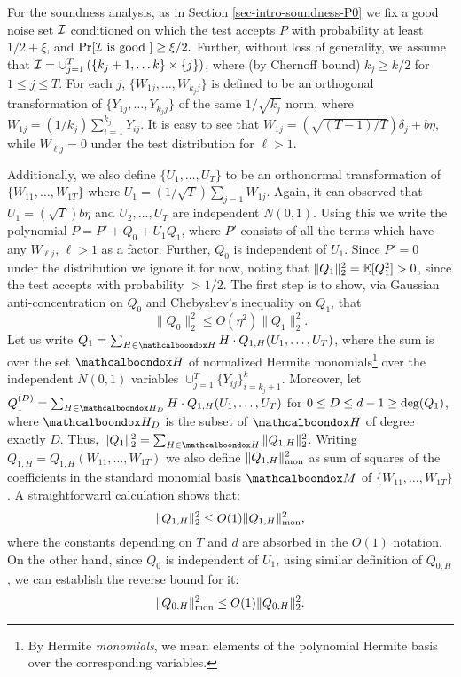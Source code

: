 For the soundness analysis, as in Section
\ref{sec-intro-soundness-P0} we fix a good noise set $\mathcal{I}$ 
conditioned on which the test accepts $P$ with probability at least
$1/2 + \xi$, and $\Pr[\mathcal{I} \textnormal{ is good }] \geq \xi/2.$ 
Further, without loss of generality, we assume that $\mathcal{I} = \cup_{j=1}^T \left(\{k_j + 1,\dots
k\}\times\{j\}\right)$, where (by Chernoff bound) $k_j \geq k/2$ for
$1\leq j \leq T$. For each $j$, $\{W_{1j},\dots, W_{k_jj}\}$ is
defined to be an orthogonal transformation of $\{Y_{1j},\dots,
Y_{k_jj}\}$ of the same $1/\sqrt{k_j}$ norm, where $W_{1j} =
(1/k_j)\sum_{i=1}^{k_j}Y_{ij}$. It is easy to see that $W_{1j} =  
(\sqrt{(T-1)/T})\delta_{j} + b\eta$, while $W_{\ell j} = 0$ under the
test distribution for $\ell > 1$.

Additionally, we also define $\{U_1,\dots, U_T\}$ to be an orthonormal
transformation of $\{W_{11},\dots, W_{1T}\}$ where $U_1 =
(1/\sqrt{T})\sum_{j=1}W_{1j}$. Again, it can observed that $U_1 =
(\sqrt{T})b\eta$ and $U_2,\dots, U_T$ are independent $N(0,1)$. Using
this we write  the polynomial $P = P' + Q_0 + U_1 Q_1$, where $P'$
consists of all the terms which have any $W_{\ell j}$, $\ell > 1$ as a
factor. Further, $Q_0$ is independent of $U_1$. Since $P' = 0$ under
the distribution we ignore it for now, noting that $\|Q_1\|_2^2 =
\mathbb{E}[Q_1^2] > 0$, since the test accepts with probability $ > 1/2$. 
The first step is to show, via Gaussian
anti-concentration on $Q_0$ and Chebyshev's inequality on $Q_1$, that
\begin{equation}\label{eqn:relative}
\|Q_0\|_2^2 \leq O(\eta^2)\|Q_1\|_2^2.
\end{equation}
Let us write $Q_1 = \sum_{H\in \mcb{H}} H\cdot Q_{1,H}(U_1,\dots, U_T)$, where the
sum is over the set $\mcb{H}$ of normalized Hermite monomials\footnote{By Hermite \emph{monomials},
we mean elements of the polynomial Hermite basis over the corresponding variables.} 
over the independent $N(0,1)$
variables $\cup_{j=1}^T\{Y_{ij}\}_{i=k_j+
1}^k$. Moreover, let  $Q^{(D)}_1 = \sum_{H \in \mcb{H}_D} 
H\cdot Q_{1,H}(U_1,\dots, U_T)$ for $0\leq D \leq
d-1 \geq \textnormal{deg}(Q_1)$, where $\mcb{H}_D$ is the subset of $\mcb{H}$
of degree exactly $D$.
Thus,  $\|Q_1\|_2^2 = \sum_{H\in \mcb{H}} \|Q_{1,H}\|_2^2$. Writing
$Q_{1,H} = Q_{1,H}(W_{11}, \dots, W_{1T})$ we also
define $\|Q_{1,H}\|_{\textnormal{mon}}^2$ as sum of squares of the
coefficients in 
the standard monomial basis $\mcb{M}$ of $\{W_{11}, \dots, W_{1T}\}$. A
straightforward calculation shows that:
\begin{equation}\label{eqn:relative2}
\|Q_{1,H}\|_2^2  \leq O(1)
\|Q_{1,H}\|_{\textnormal{mon}}^2,
\end{equation}
where the constants depending on $T$ and $d$ are absorbed in 
the $O(1)$ notation.	
On the other hand, since $Q_0$ is independent of $U_1$, using similar
definition of $Q_{0,H}$, we can
establish the reverse bound for it:
\begin{equation}\label{eqn:relative3}
\|Q_{0,H}\|_{\textnormal{mon}}^2  \leq O(1)\|Q_{0,H}\|_2^2.
\end{equation}

